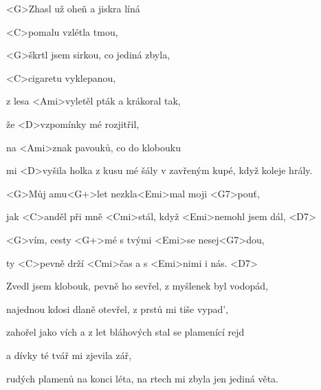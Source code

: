 

\zs
<G>Zhasl už oheň a jiskra líná

<C>pomalu vzlétla tmou,

<G>škrtl jsem sirkou, co jediná zbyla,

<C>cigaretu vyklepanou,

z lesa <Ami>vyletěl pták a krákoral tak,

že <D>vzpomínky mé rozjitřil,

na <Ami>znak pavouků, co do klobouku

mi <D>vyšila holka z kusu mé šály v zavřeným kupé, když koleje hrály.
\ks


\zr
<G>Můj amu<G+>let nezkla<Emi>mal moji <G7>pouť,

jak <C>anděl při mně <Cmi>stál, když <Emi>nemohl jsem dál, <D7>

<G>vím, cesty <G+>mé s tvými <Emi>se nesej<G7>dou,

ty <C>pevně drží <Cmi>čas a s <Emi>nimi i nás. <D7>
\kr

\zs
Zvedl jsem klobouk, pevně ho sevřel, z myšlenek byl vodopád,

najednou kdosi dlaně otevřel, z prstů mi tiše vypad',

zahořel jako vích a z let bláhových stal se plamenící rejd

a dívky té tvář mi zjevila zář,

rudých plamenů na konci léta, na rtech mi zbyla jen jediná věta.
\ks

\zr
\kr

\kp
